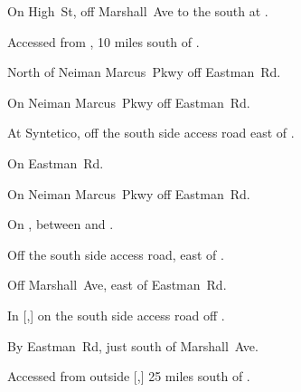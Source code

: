 
\begin{LocationList}

On High~St, off  Marshall~Ave to the south at .

Accessed from , 10 miles south of .

North of Neiman Marcus~Pkwy off  Eastman~Rd.

On Neiman Marcus~Pkwy off  Eastman~Rd.

At Syntetico, off the  south side access road east of .

On  Eastman~Rd.

On Neiman Marcus~Pkwy off  Eastman~Rd.

On , between  and .

Off the  south side access road, east of .

Off  Marshall~Ave, east of  Eastman~Rd.

\Location{\TruckStop \Gas \Rest \Service \Weigh}
In [,] on the south side  access road off .

By  Eastman~Rd, just south of  Marshall~Ave.

Accessed from  outside [,] 25 miles south of .

\end{LocationList}
